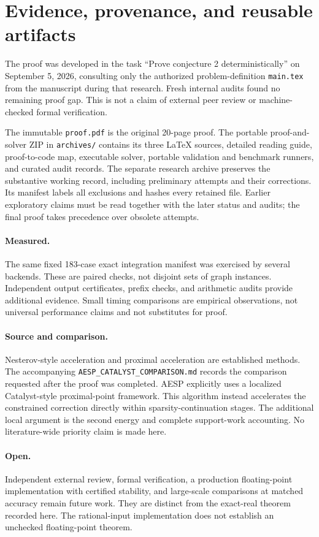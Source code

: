 \section{Evidence, provenance, and reusable artifacts}
The proof was developed in the task ``Prove conjecture 2 deterministically''
on September 5, 2026, consulting only the authorized problem-definition
\texttt{main.tex} from the manuscript during that research. Fresh internal
audits found no remaining proof gap. This is not a claim of external peer
review or machine-checked formal verification.

The immutable \texttt{proof.pdf} is the original 20-page proof.
The portable proof-and-solver ZIP in \texttt{archives/} contains its three
LaTeX sources, detailed reading guide, proof-to-code map, executable solver,
portable validation and benchmark runners, and curated audit records.
The separate research archive preserves the substantive working record,
including preliminary attempts and their corrections. Its manifest labels
all exclusions and hashes every retained file. Earlier exploratory claims
must be read together with the later status and audits; the final proof takes
precedence over obsolete attempts.

\paragraph{Measured.}
The same fixed 183-case exact integration manifest was exercised by several
backends. These are paired checks, not disjoint sets of graph instances.
Independent output certificates, prefix checks, and arithmetic audits provide
additional evidence. Small timing comparisons are empirical observations,
not universal performance claims and not substitutes for proof.

\paragraph{Source and comparison.}
Nesterov-style acceleration and proximal acceleration are established methods.
The accompanying \texttt{AESP\_CATALYST\_COMPARISON.md} records the comparison
requested after the proof was completed. AESP explicitly uses a localized
Catalyst-style proximal-point framework. This algorithm instead accelerates
the constrained correction directly within sparsity-continuation stages.
The additional local argument is the second energy and complete support-work
accounting. No literature-wide priority claim is made here.

\paragraph{Open.}
Independent external review, formal verification, a production floating-point
implementation with certified stability, and large-scale comparisons at
matched accuracy remain future work. They are distinct from the exact-real
theorem recorded here. The rational-input implementation does not establish
an unchecked floating-point theorem.
